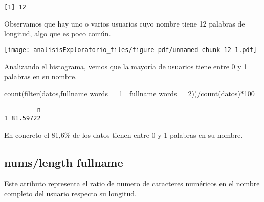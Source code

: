 \documentclass[
  letterpaper,
  DIV=11,
  numbers=noendperiod]{scrreprt}
\newenvironment{Shaded}{\begin{snugshade}}{\end{snugshade}}
\newcommand{\AttributeTok}[1]{\textcolor[rgb]{0.40,0.45,0.13}{#1}}
\newcommand{\DecValTok}[1]{\textcolor[rgb]{0.68,0.00,0.00}{#1}}
\newcommand{\FunctionTok}[1]{\textcolor[rgb]{0.28,0.35,0.67}{#1}}
\newcommand{\NormalTok}[1]{\textcolor[rgb]{0.00,0.23,0.31}{#1}}
\newcommand{\SpecialCharTok}[1]{\textcolor[rgb]{0.37,0.37,0.37}{#1}}
\newcommand{\StringTok}[1]{\textcolor[rgb]{0.13,0.47,0.30}{#1}}
\begin{document}
\begin{verbatim}
[1] 12
\end{verbatim}

Observamos que hay uno o varios usuarios cuyo nombre tiene 12 palabras
de longitud, algo que es poco común.

\begin{Shaded}
\end{Shaded}

\texttt{[image: analisisExploratorio\_files/figure-pdf/unnamed-chunk-12-1.pdf]}

Analizando el histograma, vemos que la mayoría de usuarios tiene entre 0
y 1 palabras en su nombre.

\begin{Shaded}
\begin{Highlighting}[]
\FunctionTok{count}\NormalTok{(}\FunctionTok{filter}\NormalTok{(datos,}\StringTok{\textasciigrave{}}\AttributeTok{fullname words}\StringTok{\textasciigrave{}}\SpecialCharTok{==}\DecValTok{1} \SpecialCharTok{|} \StringTok{\textasciigrave{}}\AttributeTok{fullname words}\StringTok{\textasciigrave{}}\SpecialCharTok{==}\DecValTok{2}\NormalTok{))}\SpecialCharTok{/}\FunctionTok{count}\NormalTok{(datos)}\SpecialCharTok{*}\DecValTok{100}
\end{Highlighting}
\end{Shaded}

\begin{verbatim}
         n
1 81.59722
\end{verbatim}

En concreto el 81,6\% de los datos tienen entre 0 y 1 palabras en su
nombre.

\subsection{nums/length fullname}\label{numslength-fullname}

Este atributo representa el ratio de numero de caracteres numéricos en
el nombre completo del usuario respecto su longitud.

\begin{Shaded}
\end{Shaded}
\end{document}
